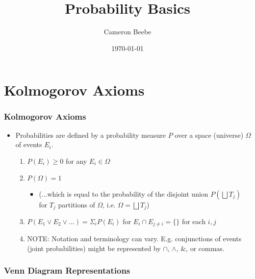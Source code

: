 \documentclass{beamer}
\title{Probability Basics}
\author{Cameron Beebe}
\institute
{
The SciPhi Initiative, LLC
\medskip
}
\date{\today}
\begin{document}
\frame{\titlepage}

\section[Outline]{}
\frame{\tableofcontents}

\section{Kolmogorov Axioms}
\frame
{
\frametitle{Kolmogorov Axioms}

\begin{itemize}
    \item<1->  Probabilities are defined by a probability measure $P$ over a space (universe) $\Omega$ of events $E_i$.  
    \begin{enumerate}
    \item<2->  $P(E_i) \geq 0$  for any $E_i \in \Omega$
    \item<3->  $P(\Omega) = 1$ 
    \begin{itemize} 
    \item<4-> (...which is equal to the probability of the disjoint union $P(\bigsqcup T_j)$ for $T_j$ partitions of $\Omega$, i.e. $\Omega = \bigsqcup T_j$)
    \end{itemize}
    \item<5->  $P(E_1 \lor E_2 \lor ...) = \Sigma_i P(E_i)$ for $E_i \cap E_{j\neq i} = \{\}$ for each $i,j$
    \item<6->  NOTE: Notation and terminology can vary.  E.g. conjunctions of events (joint probabilities) might be represented by $\cap$, $\land$, $\&$, or commas.  
    \end{enumerate}
\end{itemize}



}

\frame
{
\frametitle{Venn Diagram Representations}
\begin{center}
\end{center}
}
\end{document}

